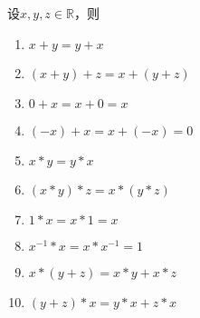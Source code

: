 \documentclass{beamer}
\begin{document}
\begin{CJK*}{UTF8}{gbsn}
\begin{frame}
  
    设$x, y, z \in \mathbb{R}$，则
   \begin{enumerate}
   \item   $x + y = y + x$
   \item   $(x + y) + z = x + (y + z)$
   \item   $0 + x = x + 0 = x$
   \item   $(-x) + x =x + (-x) = 0$
   \item   $x * y = y * x$
   \item   $(x * y) * z = x * (y *z)$
   \item   $1 * x = x * 1 = x$
   \item   $x^{-1} * x = x * x^{-1} = 1$
   \item   $x* (y + z) = x * y + x * z$
   \item   $(y + z) * x = y * x + z * x$
    \end{enumerate}
 
\end{frame}



\end{CJK*}
\end{document}
